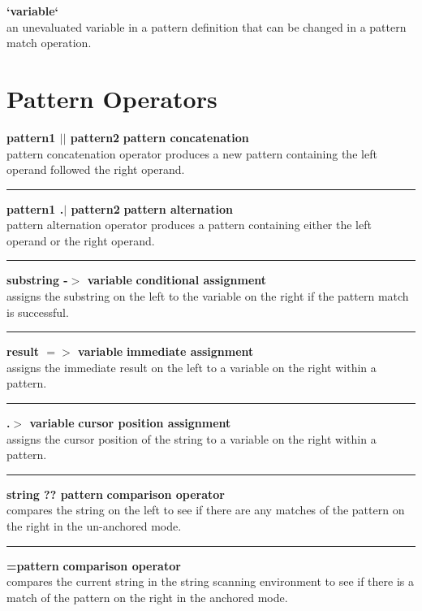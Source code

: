 \documentclass[letterpaper,12pt]{article}
\begin{document}
\noindent\textbf{`variable`} \\
an unevaluated variable in a pattern definition that can be changed in a pattern match operation.\\

\section*{Pattern Operators}
\noindent\textbf{pattern1 $\vert\vert$	pattern2} \hfill \textbf{pattern concatenation}\\
pattern concatenation operator produces a new pattern containing the left operand followed the right operand.\\
\noindent\rule{16.5cm}{0.4pt}

\noindent\textbf{pattern1 .$\vert$ pattern2} \hfill \textbf{pattern alternation}\\
pattern alternation operator produces a pattern containing either the left operand or the right operand.\\
\noindent\rule{16.5cm}{0.1pt}

\noindent\textbf{substring -$>$ variable} \hfill\textbf{conditional assignment}\\
assigns the substring on the left to the variable on the right if the pattern match is successful.\\
\noindent\rule{16.5cm}{0.1pt}

\noindent\textbf{result $=>$ variable} \hfill\textbf{immediate assignment}\\
assigns the immediate result on the left to a variable on the right within a pattern.\\
\noindent\rule{16.5cm}{0.1pt}

\noindent\textbf{.$>$ variable} \hfill\textbf{cursor position assignment}\\
assigns the cursor position of the string to a variable on the right within a pattern.\\
\noindent\rule{16.5cm}{0.1pt}

\noindent\textbf{string ?? pattern} \hfill\textbf{comparison operator}\\
compares the string on the left to see if there are any matches of the pattern on the right in the un-anchored mode.\\
\noindent\rule{16.5cm}{0.1pt}

\noindent\textbf{=pattern} \hfill\textbf{comparison operator}\\
compares the current string in the string scanning environment to see if there is a match of the pattern on the right in the anchored mode.\\
\end{document}
